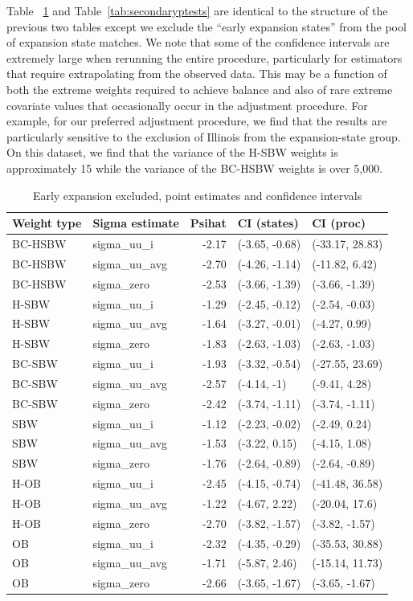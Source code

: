 \documentclass[12pt]{article}
\begin{document}
Table ~\ref{tab:confintmainc2} and Table~\ref{tab:secondaryptests} are identical to the structure of the previous two tables except we exclude the ``early expansion states'' from the pool of expansion state matches. We note that some of the confidence intervals are extremely large when rerunning the entire procedure, particularly for estimators that require extrapolating from the observed data. This may be a function of both the extreme weights required to achieve balance and also of rare extreme covariate values that occasionally occur in the adjustment procedure. For example, for our preferred adjustment procedure, we find that the results are particularly sensitive to the exclusion of Illinois from the expansion-state group. On this dataset, we find that the variance of the H-SBW weights is approximately 15 while the variance of the BC-HSBW weights is over 5,000.

\begin{table}[ht]
\begin{tabular}{llrll}
  \toprule
Weight type & Sigma estimate & Psihat & CI (states) & CI (proc) \\ 
  \midrule
BC-HSBW & sigma\_uu\_i & -2.17 & (-3.65, -0.68) & (-33.17, 28.83) \\ 
  BC-HSBW & sigma\_uu\_avg & -2.70 & (-4.26, -1.14) & (-11.82, 6.42) \\ 
  BC-HSBW & sigma\_zero & -2.53 & (-3.66, -1.39) & (-3.66, -1.39) \\ 
  H-SBW & sigma\_uu\_i & -1.29 & (-2.45, -0.12) & (-2.54, -0.03) \\ 
  H-SBW & sigma\_uu\_avg & -1.64 & (-3.27, -0.01) & (-4.27, 0.99) \\ 
  H-SBW & sigma\_zero & -1.83 & (-2.63, -1.03) & (-2.63, -1.03) \\ 
  BC-SBW & sigma\_uu\_i & -1.93 & (-3.32, -0.54) & (-27.55, 23.69) \\ 
  BC-SBW & sigma\_uu\_avg & -2.57 & (-4.14, -1) & (-9.41, 4.28) \\ 
  BC-SBW & sigma\_zero & -2.42 & (-3.74, -1.11) & (-3.74, -1.11) \\ 
  SBW & sigma\_uu\_i & -1.12 & (-2.23, -0.02) & (-2.49, 0.24) \\ 
  SBW & sigma\_uu\_avg & -1.53 & (-3.22, 0.15) & (-4.15, 1.08) \\ 
  SBW & sigma\_zero & -1.76 & (-2.64, -0.89) & (-2.64, -0.89) \\ 
  H-OB & sigma\_uu\_i & -2.45 & (-4.15, -0.74) & (-41.48, 36.58) \\ 
  H-OB & sigma\_uu\_avg & -1.22 & (-4.67, 2.22) & (-20.04, 17.6) \\ 
  H-OB & sigma\_zero & -2.70 & (-3.82, -1.57) & (-3.82, -1.57) \\ 
  OB & sigma\_uu\_i & -2.32 & (-4.35, -0.29) & (-35.53, 30.88) \\ 
  OB & sigma\_uu\_avg & -1.71 & (-5.87, 2.46) & (-15.14, 11.73) \\ 
  OB & sigma\_zero & -2.66 & (-3.65, -1.67) & (-3.65, -1.67) \\ 
   \bottomrule
\end{tabular}
\caption{Early expansion excluded, point estimates and confidence intervals}
\label{tab:confintmainc2}
\end{table}
\end{document}
